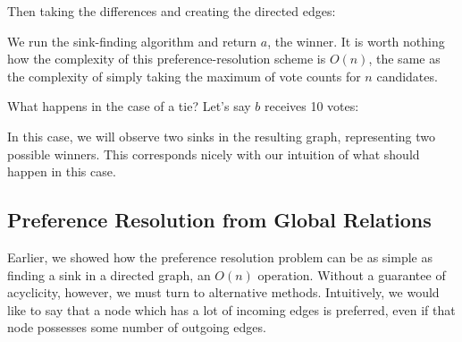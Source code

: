 Then taking the differences and creating the directed edges:

\begin{center}
\end{center}

We run the sink-finding algorithm and return $a$, the winner.
It is worth nothing how the complexity of this preference-resolution scheme is $O(n)$, the same as the complexity of simply taking the maximum of vote counts for $n$ candidates.

What happens in the case of a tie?
Let's say $b$ receives 10 votes:

\begin{center}
\end{center}

\begin{center}
\end{center}

In this case, we will observe two sinks in the resulting graph, representing two possible winners.
This corresponds nicely with our intuition of what should happen in this case.

\subsection{Preference Resolution from Global Relations}

Earlier, we showed how the preference resolution problem can be as simple as finding a sink in a directed graph, an $O(n)$ operation.
Without a guarantee of acyclicity, however, we must turn to alternative methods.
Intuitively, we would like to say that a node which has a lot of incoming edges is preferred, even if that node possesses some number of outgoing edges.


